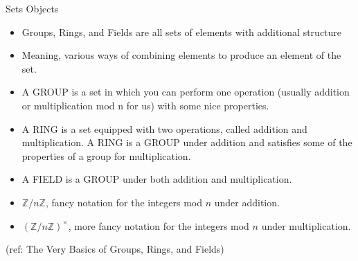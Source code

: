 \begin{frame}{Sets Objects}
\begin{itemize}
\item Groups, Rings, and Fields are  all sets of elements with additional structure
\item Meaning, various ways of combining elements to produce an element of the set. 
\item A GROUP is a set in which you can perform one operation (usually
addition or multiplication mod n for us) with some nice properties. 
\item A RING is a set equipped with two operations, called addition and multiplication. A RING is a GROUP under addition
and satisfies some of the properties of a group for multiplication. 
\item A FIELD is a GROUP under both addition and multiplication.

\item ${\mathbb Z} / n {\mathbb Z}$, fancy notation for the integers mod $n$ under addition.
\item $({\mathbb Z} / n {\mathbb Z})^\times$, more fancy notation for the integers mod $n$ under multiplication.
\end{itemize}

\tiny{(ref: The Very Basics of Groups, Rings, and Fields)}

\end{frame}


